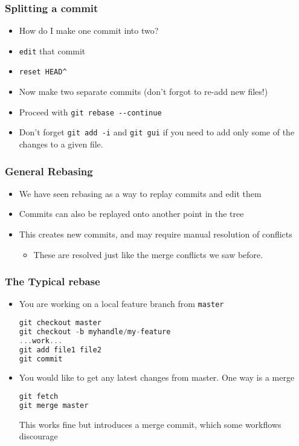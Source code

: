 \documentclass{beamer}
\begin{document}
\begin{frame}[fragile]
\frametitle{Splitting a commit}
\begin{itemize}
\item How do I make one commit into two?
\item \texttt{edit} that commit
\item \lstinline{reset HEAD^}
\item Now make two separate commits (don't forgot to re-add new files!)
\item Proceed with \lstinline{git rebase --continue}
\item Don't forget \lstinline{git add -i} and \lstinline{git gui} if you need to add only some of the changes to a given file.
\end{itemize}
\end{frame}

\begin{frame}[fragile]
\frametitle{General Rebasing}
\begin{itemize}
\item We have seen rebasing as a way to replay commits and edit them
\item Commits can also be replayed onto another point in the tree
\item This creates new commits, and may require manual resolution of conflicts
\begin{itemize}
\item These are resolved just like the merge conflicts we saw before.
\end{itemize}
\end{itemize}
\end{frame}

\begin{frame}[fragile]
\frametitle{The Typical rebase}
\begin{itemize}
\item You are working on a local feature branch from \texttt{master}
\begin{lstlisting}[language=C++]
git checkout master
git checkout -b myhandle/my-feature
...work...
git add file1 file2
git commit
\end{lstlisting}
\item You would like to get any latest changes from master. One way is a merge
\begin{lstlisting}[language=C++]
git fetch
git merge master
\end{lstlisting}
This works fine but introduces a merge commit, which some workflows discourage
\end{itemize}
\end{frame}
\end{document}
